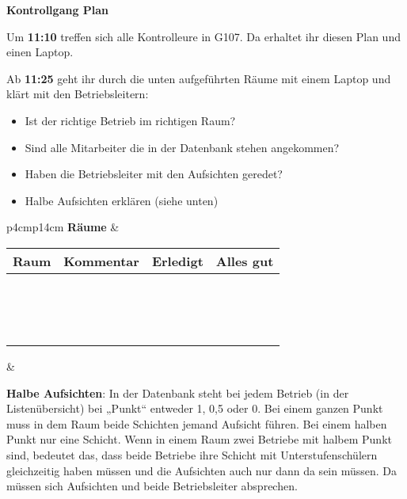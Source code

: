 \documentclass[12pt]{article}
\begin{document}
\textbf{\LARGE{Kontrollgang Plan}}

\vspace{0.5cm}

Um \textbf{11:10} treffen sich alle Kontrolleure in G107. Da erhaltet ihr diesen Plan
und einen Laptop.

Ab \textbf{11:25} geht ihr durch die unten aufgeführten Räume mit einem Laptop und klärt mit den
Betriebsleitern:

\begin{itemize}
    \item Ist der richtige Betrieb im richtigen Raum?
    \item Sind alle Mitarbeiter die in der Datenbank stehen angekommen?
    \item Haben die Betriebsleiter mit den Aufsichten geredet?
    \item Halbe Aufsichten erklären (siehe unten)
\end{itemize}

\renewcommand{\arraystretch}{1.5}
\vspace{3mm}
\begin{tabular}{p{4cm}p{14cm}}
    \textbf{Räume} & \\[2mm]
    \begin{tabular}{|p{}|p{}|p{}|p{}|}
        \hline
        \textbf{Raum} & \textbf{Kommentar} & \textbf{Erledigt} & \textbf{Alles gut}\\ \hline
        & & & \\ \hline
        & & & \\ \hline
        & & & \\ \hline
        & & & \\ \hline
        & & & \\ \hline
        & & & \\ \hline
        & & & \\ \hline
        & & & \\ \hline
        & & & \\ \hline
        & & & \\ \hline
        & & & \\ \hline
        & & & \\ \hline
        & & & \\ \hline
        & & & \\ \hline
        & & & \\ \hline
    \end{tabular} & \\
\end{tabular}

\vspace{5mm}

\textbf{Halbe Aufsichten}: In der Datenbank steht bei jedem Betrieb (in der Listenübersicht) bei „Punkt“
entweder 1, 0,5 oder 0. Bei einem ganzen Punkt muss in dem Raum beide Schichten jemand Aufsicht
führen. Bei einem halben Punkt nur eine Schicht. Wenn in einem Raum zwei Betriebe mit halbem Punkt
sind, bedeutet das, dass beide Betriebe ihre Schicht mit Unterstufenschülern gleichzeitig haben
müssen und die Aufsichten auch nur dann da sein müssen. Da müssen sich Aufsichten und beide
Betriebsleiter absprechen.

\vspace{0.4cm}
\end{document}
